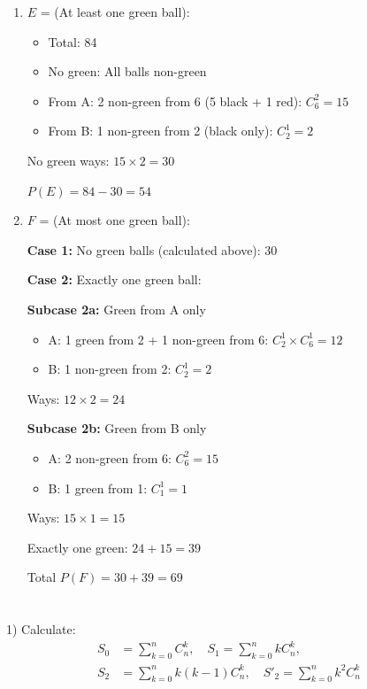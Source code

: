 \documentclass[12pt]{article}
\begin{document}
\begin{correctionbox}
\begin{enumerate}
    Total $P(D) = 2 + 12 = 14$
    
    \item $E$ = (At least one green ball):
    \begin{itemize}
        \item Total: 84
        \item No green: All balls non-green
        \item From A: 2 non-green from 6 (5 black + 1 red): $C_6^2 = 15$
        \item From B: 1 non-green from 2 (black only): $C_2^1 = 2$
    \end{itemize}
    No green ways: $15 \times 2 = 30$
    
    $P(E) = 84 - 30 = 54$
    
    \item $F$ = (At most one green ball):
    
    \textbf{Case 1:} No green balls (calculated above): 30
    
    \textbf{Case 2:} Exactly one green ball:
    
    \textbf{Subcase 2a:} Green from A only
    \begin{itemize}
        \item A: 1 green from 2 + 1 non-green from 6: $C_2^1 \times C_6^1 = 12$
        \item B: 1 non-green from 2: $C_2^1 = 2$
    \end{itemize}
    Ways: $12 \times 2 = 24$
    
    \textbf{Subcase 2b:} Green from B only
    \begin{itemize}
        \item A: 2 non-green from 6: $C_6^2 = 15$
        \item B: 1 green from 1: $C_1^1 = 1$
    \end{itemize}
    Ways: $15 \times 1 = 15$
    
    Exactly one green: $24 + 15 = 39$
    
    Total $P(F) = 30 + 39 = 69$
\end{enumerate}
\end{correctionbox}

\section{}
1) Calculate:
\begin{align*}
S_0 &= \sum_{k=0}^{n} C_n^k, \quad S_1 = \sum_{k=0}^{n} kC_n^k, \\
S_2 &= \sum_{k=0}^{n} k(k-1)C_n^k, \quad S'_2 = \sum_{k=0}^{n} k^2C_n^k
\end{align*}
\end{document}
